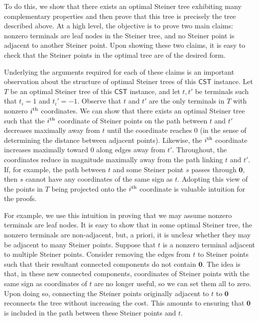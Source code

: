 \documentclass{article}\providecommand{\DeclareRedundantLanguages}[2]{}\usepackage[a4paper,margin=20mm]{geometry}
\newcommand{\1}{\textbf{1}}
\newcommand{\cst}{$\mathsf{CST}$\xspace}
\begin{document}
To do this, we show that there exists an optimal Steiner tree exhibiting many complementary properties and then prove that this tree is precisely the tree described above. At a high level, the objective is to prove two main claims: nonzero terminals are leaf nodes in the Steiner tree, and no Steiner point is adjacent to another Steiner point. Upon showing these two claims, it is easy to check that the Steiner points in the optimal tree are of the desired form.

Underlying the arguments required for each of these claims is an important observation about the structure of optimal Steiner trees of this \cst instance. Let $T$ be an optimal Steiner tree of this \cst instance, and let $t, t'$ be terminals such that $t_i = 1$ and $t_i' = -1$.  Observe that $t$ and $t'$ are the only terminals in $T$ with nonzero $i\textsuperscript{th} $ coordinates. We can show that there exists an optimal Steiner tree such that the $i\textsuperscript{th} $ coordinate of Steiner points  on the path between $t$ and $t'$  decreases maximally away from $t$ until the coordinate reaches $0$ (in the sense of determining the distance between adjacent points). Likewise, the $i\textsuperscript{th} $ coordinate increases maximally toward $0$ along edges away from $t'$. Throughout, the coordinates reduce in magnitude maximally away from the path linking $t$ and $t'$. If, for example, the path between $t$ and some Steiner point $s$ passes through $\mathbf{0}$, then $s$ cannot have any coordinates of the same sign as $t$. Adopting this view of the points in $T$ being projected onto the $i\textsuperscript{th} $ coordinate is valuable intuition for the proofs.

For example, we use this intuition in proving that we may assume nonzero terminals are leaf nodes. It is easy to show that in some optimal Steiner tree, the nonzero terminals are non-adjacent, but, a priori, it is unclear whether they may be adjacent to many Steiner points. Suppose that $t$ is a nonzero terminal adjacent to multiple Steiner points. Consider removing the edges from $t$ to Steiner points such that their resultant connected components do not contain $\mathbf{0}$. The idea is that, in these new connected components, coordinates of Steiner points with the same sign as coordinates of $t$ are no longer useful, so we can set them all to zero. Upon doing so, connecting the Steiner points originally adjacent to $t$ to $\mathbf{0}$ reconnects the tree without increasing the cost. This amounts to ensuring that $\mathbf{0}$ is included in the path between these Steiner points and $t$.
\end{document}
